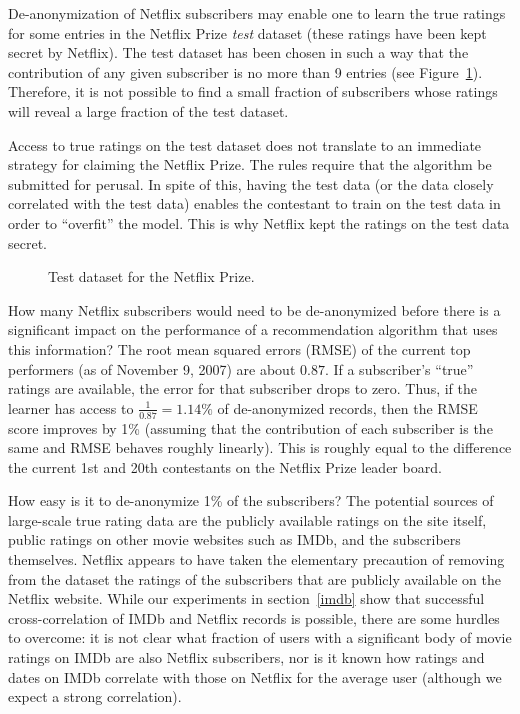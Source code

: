 \documentclass[11pt]{article}
\begin{document}
\begin{appendix}
De-anonymization of Netflix subscribers may enable one to learn the
true ratings for some entries in the Netflix Prize \emph{test} dataset
(these ratings have been kept secret by Netflix).  The test dataset has
been chosen in such a way that the contribution of any given subscriber
is no more than 9 entries (see Figure~\ref{fig:testdata}).  Therefore,
it is not possible to find a small fraction of subscribers whose ratings
will reveal a large fraction of the test dataset.

Access to true ratings on the test dataset does not translate to an
immediate strategy for claiming the Netflix Prize.  The rules require
that the algorithm be submitted for perusal.  In spite of this, having the
test data (or the data closely correlated with the test data) enables the
contestant to train on the test data in order to ``overfit'' the model.
This is why Netflix kept the ratings on the test data secret.

\begin{figure}[h]
\centering
\mbox{}
\caption{Test dataset for the Netflix Prize.
\label{fig:testdata}}
\end{figure}

How many Netflix subscribers would need to be de-anonymized before there
is a significant impact on the performance of a recommendation algorithm
that uses this information?  The root mean squared errors (RMSE) of
the current top performers (as of November 9, 2007) are about $0.87$.  If a
subscriber's ``true'' ratings are available, the error for that subscriber
drops to zero.  Thus, if the learner has access to $\frac{1}{0.87} =
1.14\%$ of de-anonymized records, then the RMSE score improves by 1\%
(assuming that the contribution of each subscriber is the same and RMSE
behaves roughly linearly).  This is roughly equal to the difference the
current 1st and 20th contestants on the Netflix Prize leader board.

How easy is it to de-anonymize 1\% of the subscribers? The potential
sources of large-scale true rating data are the publicly available
ratings on the site itself, public ratings on other movie websites such
as IMDb, and the subscribers themselves.  Netflix appears to have taken
the elementary precaution of removing from the dataset the ratings of
the subscribers that are publicly available on the Netflix website.
While our experiments in section~\ref{imdb} show that successful
cross-correlation of IMDb and Netflix records is possible, there are
some hurdles to overcome: it is not clear what fraction of users with a
significant body of movie ratings on IMDb are also Netflix subscribers,
nor is it known how ratings and dates on IMDb correlate with those on
Netflix for the average user (although we expect a strong correlation).


\end{appendix}
\end{document}
